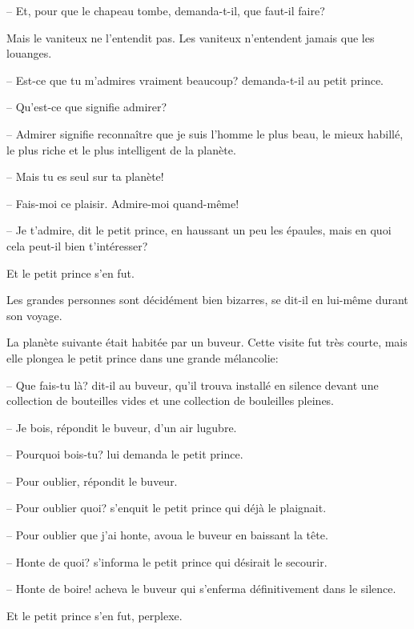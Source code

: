 \documentclass[a4paper]{report}
\begin{document}
-- Et, pour que le chapeau tombe, demanda-t-il, que faut-il faire?

Mais le vaniteux ne l'entendit pas. Les vaniteux n'entendent jamais que les louanges.

-- Est-ce que tu m'admires vraiment beaucoup? demanda-t-il au petit prince.

-- Qu'est-ce que signifie admirer?

-- Admirer signifie reconnaître que je suis l'homme le plus beau, le mieux habillé, le plus riche et le plus intelligent de la planète.

-- Mais tu es seul sur ta planète!

-- Fais-moi ce plaisir. Admire-moi quand-même!

-- Je t'admire, dit le petit prince, en haussant un peu les épaules, mais en quoi cela peut-il bien t'intéresser?

Et le petit prince s'en fut.

Les grandes personnes sont décidément bien bizarres, se dit-il en lui-même durant son voyage.

\parachapter{} %
La planète suivante était habitée par un buveur. Cette visite fut très courte, mais elle plongea le petit prince dans une grande mélancolie:

-- Que fais-tu là? dit-il au buveur, qu'il trouva installé en silence devant une collection de bouteilles vides et une collection de bouleilles pleines.


-- Je bois, répondit le buveur, d'un air lugubre.

-- Pourquoi bois-tu? lui demanda le petit prince.

-- Pour oublier, répondit le buveur.

-- Pour oublier quoi? s'enquit le petit prince qui déjà le plaignait.

-- Pour oublier que j'ai honte, avoua le buveur en baissant la tête.

-- Honte de quoi? s'informa le petit prince qui désirait le secourir.

-- Honte de boire! acheva le buveur qui s'enferma définitivement dans le silence.

Et le petit prince s'en fut, perplexe.
\end{document}
